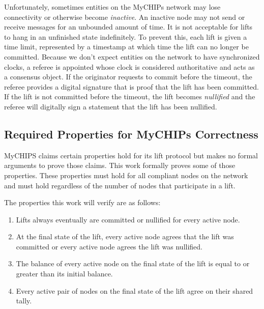 \documentclass[runningheads]{llncs}
\begin{document}
Unfortunately, sometimes entities on the MyCHIPs network may lose connectivity or otherwise become \emph{inactive}. An inactive node may not send or receive messages for an unbounded amount of time. It is not acceptable for lifts to hang in an unfinished state indefinitely. To prevent this, each lift is given a time limit, represented by a timestamp at which time the lift can no longer be committed. Because we don't expect entities on the network to have synchronized clocks, a referee is appointed whose clock is considered authoritative and acts as a consensus object. If the originator requests to commit before the timeout, the referee provides a digital signature that is proof that the lift has been committed. If the lift is not committed before the timeout, the lift becomes \emph{nullified} and the referee will digitally sign a statement that the lift has been nullified.

\subsection{Required Properties for MyCHIPs Correctness}\label{sec:requiredProperties}

MyCHIPS claims certain properties hold for its lift protocol but makes no formal arguments to prove those claims. This work formally proves some of those properties. These properties must hold for all compliant nodes on the network and must hold regardless of the number of nodes that participate in a lift. 

The properties this work will verify are as follows:

\begin{enumerate}
\item Lifts always eventually are committed or nullified for every active node. 
\item At the final state of the lift, every active node agrees that the lift was committed or every active node agrees the lift was nullified. 
\item The balance of every active node on the final state of the lift is equal to or greater than its initial balance.
\item Every active pair of nodes on the final state of the lift agree on their shared tally.
\end{enumerate}
\end{document}
